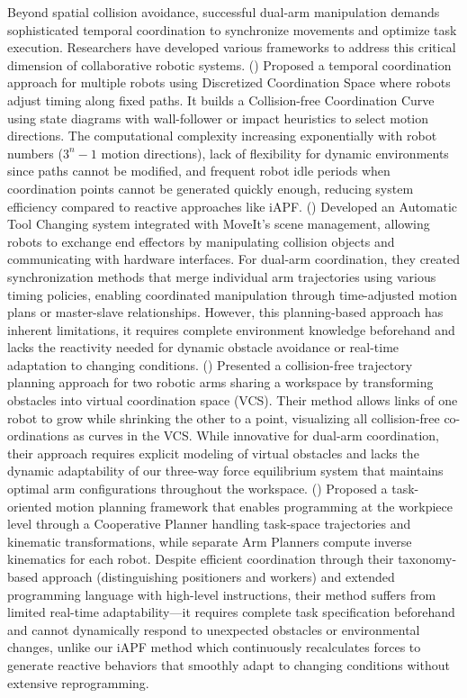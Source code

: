\documentclass[utf8]{FrontiersinHarvard}
\begin{document}
Beyond spatial collision avoidance, successful dual-arm manipulation demands sophisticated temporal coordination to synchronize movements and optimize task execution. Researchers have developed various frameworks to address this critical dimension of collaborative robotic systems. (\citet{MONTANO201673}) Proposed a temporal coordination approach for multiple robots using Discretized Coordination Space where robots adjust timing along fixed paths. It builds a Collision-free Coordination Curve using state diagrams with wall-follower or impact heuristics to select motion directions. The computational complexity increasing exponentially with robot numbers ($3^{n}-1$ motion directions), lack of flexibility for dynamic environments since paths cannot be modified, and frequent robot idle periods when coordination points cannot be generated quickly enough, reducing system efficiency compared to reactive approaches like iAPF. (\citet{MALVIDOFRESNILLO2023102559}) Developed an Automatic Tool Changing system integrated with MoveIt's scene management, allowing robots to exchange end effectors by manipulating collision objects and communicating with hardware interfaces. For dual-arm coordination, they created synchronization methods that merge individual arm trajectories using various timing policies, enabling coordinated manipulation through time-adjusted motion plans or master-slave relationships. However, this planning-based approach has inherent limitations, it requires complete environment knowledge beforehand and lacks the reactivity needed for dynamic obstacle avoidance or real-time adaptation to changing conditions. (\citet{shin1989collision}) Presented a collision-free trajectory planning approach for two robotic arms sharing a workspace by transforming obstacles into virtual coordination space (VCS). Their method allows links of one robot to grow while shrinking the other to a point, visualizing all collision-free co-ordinations as curves in the VCS. While innovative for dual-arm coordination, their approach requires explicit modeling of virtual obstacles and lacks the dynamic adaptability of our three-way force equilibrium system that maintains optimal arm configurations throughout the workspace. (\citet{BASILE2012569}) Proposed a task-oriented motion planning framework that enables programming at the workpiece level through a Cooperative Planner handling task-space trajectories and kinematic transformations, while separate Arm Planners compute inverse kinematics for each robot. Despite efficient coordination through their taxonomy-based approach (distinguishing positioners and workers) and extended programming language with high-level instructions, their method suffers from limited real-time adaptability—it requires complete task specification beforehand and cannot dynamically respond to unexpected obstacles or environmental changes, unlike our iAPF method which continuously recalculates forces to generate reactive behaviors that smoothly adapt to changing conditions without extensive reprogramming.
\end{document}
